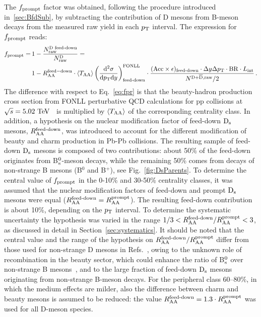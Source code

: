 The $f_{\rm prompt}$ factor was obtained, following the procedure 
introduced in~\ref{sec:BfdSub}, by subtracting the contribution of 
D mesons from B-meson decays from the measured raw yield 
in each $p_{\rm T}$ interval. The expression for $f_{\rm prompt}$ reads:
\begin{equation}
\label{eq:fprAA}
\begin{split}
f_{\mathrm{prompt}} = \, & 1- \frac{N^{\text{D~feed-down}}_{\mathrm{raw}}}{N^{\mathrm{D}}_{\mathrm{raw}}}=\\
& 1- R_{\rm AA} ^{\rm feed-down} \cdot  \langle T_{\rm AA} \rangle \left (\frac{\rm d^2 \sigma}{\mathrm dp_{\rm T} \mathrm d y} \right)^{\rm FONLL}_{\text{feed-down}} \cdot  \frac{(\mathrm{Acc} \times \epsilon)_\text{feed-down} \cdot \Delta y \Delta p_{\rm T} \cdot \mathrm{BR} \cdot L_{\rm int}}{N^{\rm D +\overline{D},raw}/2}\,.
\end{split}
\end{equation}
The difference with respect to Eq.~\ref{eq:fpr} is that the beauty-hadron 
production cross section from FONLL perturbative QCD
calculations for pp collisions at $\sqrt{s}=5.02~\mathrm{TeV}$~\cite{Cacciari:2012ny}
is multiplied by $\langle T_{\rm AA} \rangle$ of the corresponding centrality class. 
In addition, a hypothesis on the nuclear 
modification factor of feed-down ${\rm D_s}$ mesons, $R_{\rm AA}^{\textnormal{feed-down}}$, was 
introduced to account for the different modification of beauty and charm 
production in Pb-Pb collisions. The resulting sample of 
feed-down ${\rm D_s}$ mesons is composed of two 
contributions: about 50\% of the feed-down originates from 
B$^0_{\rm s}$-meson decays, while the remaining 50\% comes from decays of 
non-strange B mesons (B$^0$ and B$^+$), see Fig.~\ref{fig:DsParents}.
To determine the central value of $f_{\rm prompt}$ in the 0-10\% 
and 30-50\% centrality classes, it was assumed that the 
nuclear modification factors of feed-down and prompt ${\rm D_s}$ mesons were equal 
($R_{\rm AA}^{\textnormal{feed-down}}=R_{\rm AA}^{\rm prompt}$). 
The resulting feed-down contribution is about 10\%, depending on the
$p_{\rm T}$ interval.
To determine the systematic uncertainty the hypothesis
was varied in the range $1/3<R_{\rm AA}^{\textnormal{feed-down}}/R_{\rm AA}^{\rm prompt}<3$, as 
discussed in detail in Section~\ref{sec:systematics}.
It should be noted that the central value and the range of the hypothesis
on $R_{\rm AA}^{\textnormal{feed-down}}/R_{\rm AA}^{\rm prompt}$ differ from those used for
non-strange D mesons in Refs.~\cite{ALICE-PUBLIC-2017-003,Adam:2015sza},
owing to the unknown role of recombination in the beauty sector, which
could enhance the ratio of B$^0_{\rm s}$ over non-strange B mesons~\cite{TAMULHC}, and to the
large fraction of feed-down ${\rm D_s}$ mesons originating from non-strange B-meson 
decays.
For the peripheral class 60--80\%, in which the medium effects are milder, 
also the difference between charm and beauty mesons is assumed to be 
reduced: the value $R_{\rm AA}^{\textnormal{feed-down}}=1.3\cdot R_{\rm AA}^{\rm prompt}$ 
was used for all D-meson species. 


